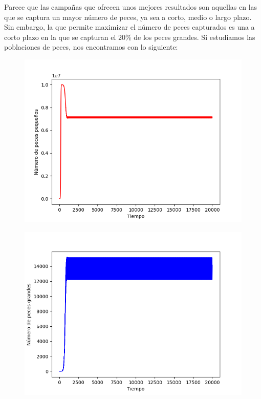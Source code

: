 \documentclass[11pt,a4paper]{report}
\begin{document}
Parece que las campañas que ofrecen unos mejores resultados son aquellas en las que se captura un mayor número de peces,
ya sea a corto, medio o largo plazo. Sin embargo, la que permite maximizar el número de peces capturados es una a corto
plazo en la que se capturan el 20\% de los peces grandes. Si estudiamos las poblaciones de peces, nos encontramos 
con lo siguiente:

\begin{figure}[H]
\centering
\begin{minipage}{.5\textwidth}
  \centering
  \includegraphics[scale=0.4]{img/peces-c-p.png}
  \label{fig:peces-c-p}
\end{minipage}%
\begin{minipage}{.5\textwidth}
  \centering
  \includegraphics[scale=0.4]{img/peces-c-g.png}

\end{minipage}
\end{figure}
\end{document}

